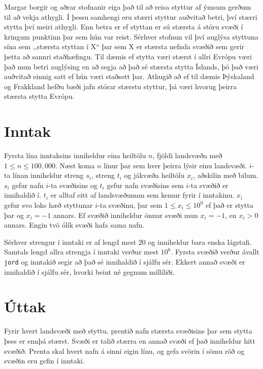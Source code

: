 
Margar borgir og aðrar stofnanir eiga það til að reisa
styttur af ýmsum gerðum til að vekja athygli.
Í þessu samhengi eru stærri styttur auðvitað betri, því
stærri stytta því meiri athygli.
Enn betra er ef styttan er sú stærsta á stóru svæði í
kringum punktinn þar sem hún var reist.
Sérhver stofnun vil því auglýsa styttuna sína sem ,,stærsta
styttan í X`` þar sem X er stærsta nefnda svæðið sem gerir
þetta að sannri staðhæfingu.
Til dæmis ef stytta væri stærst í allri Evrópu væri það mun
betri auglýsing en að segja að það sé stærsta stytta Íslands,
þó það væri auðvitað einnig satt ef hún væri staðsett þar.
Athugið að ef til dæmis Þýskaland og Frakkland hefðu bæði
jafn stórar stærstu styttur, þá væri hvorug þeirra stærsta
stytta Evrópu.

\section*{Inntak}
Fyrsta lína inntaksins inniheldur eina heiltölu $n$, fjöldi
landsvæða með $1 \leq n \leq 100,000$.
Næst koma $n$ línur þar sem hver þeirra lýsir einu landsvæði.
$i$-ta línan inniheldur streng $s_i$, streng $t_i$ og jákvæða
heiltölu $x_i$, aðskilin með bilum.
$s_i$ gefur nafn $i$-ta svæðisins og $t_i$ gefur nafn 
svæðisins sem $i$-ta svæðið er innihaldið í.
$t_i$ er alltaf eitt af landsvæðunum sem kemur fyrir í
inntakinu.
$x_i$ gefur svo loks hæð styttunar $i$-ta svæðinu, þar sem
$1 \leq x_i \leq 10^9$ ef það er stytta þar og $x_i = -1$ annars.
Ef svæðið inniheldur önnur svæði mun $x_i = -1$, en $x_i > 0$
annars.
Engin tvö ólík svæði hafa sama nafn.

Sérhver strengur í inntaki er af lengd mest $20$ og inniheldur
bara enska lágstafi.
Samtals lengd allra strengja í inntaki verður mest $10^6$.
Fyrsta svæðið verður ávallt \texttt{jord} og inntakið segir
að það sé innihaldið í sjálfu sér. 
Ekkert annað svæði er innihaldið
í sjálfu sér, hvorki beint né gegnum milliliði.

\section*{Úttak}
Fyrir hvert landsvæði með styttu, prentið nafn stærsta 
svæðisins þar sem stytta þess er ennþá stærst. Svæði er 
talið stærra en annað svæði ef það inniheldur hitt svæðið.
Prenta skal hvert nafn á sinni eigin línu, og gefa svörin
í sömu röð og svæðin eru gefin í inntaki.
